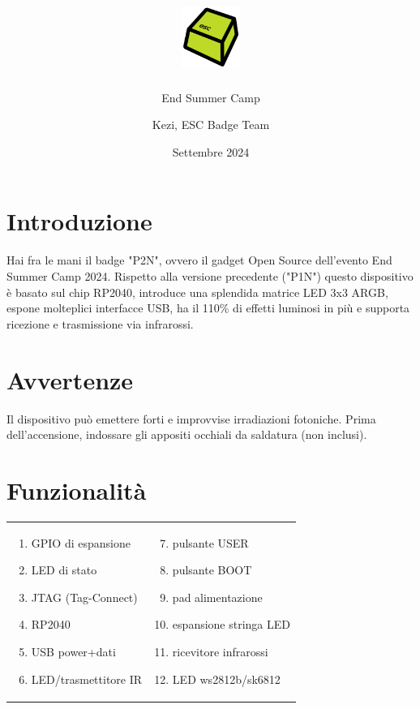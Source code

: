 \documentclass[10pt]{datasheet}
\title{\includegraphics[height=2cm]{logo} \raisebox{1\height}{Hardware mini-badge "P2N"}}
\author{End Summer Camp}
\date{Settembre 2024}
\author{Kezi, ESC Badge Team}
\begin{document}
	\maketitle
	
	\section{Introduzione}
	Hai fra le mani il badge "P2N", ovvero il gadget Open Source dell'evento End Summer Camp 2024.
	Rispetto alla versione precedente ("P1N") questo dispositivo è basato sul chip RP2040, introduce una splendida matrice LED 3x3 ARGB, espone molteplici interfacce USB, ha il 110\% di effetti luminosi in più e supporta ricezione e trasmissione via infrarossi.
	
	\section{Avvertenze}
	Il dispositivo può emettere forti e improvvise irradiazioni fotoniche.
	Prima dell'accensione, indossare gli appositi occhiali da saldatura
	(non inclusi).
	
	\section{Funzionalità}
	\begin{tabular}{l l}
		  \begin{minipage}{1.45in}

				\begin{enumerate}[itemsep=1pt]
				\item{GPIO di espansione}
				\item{LED di stato}
				\item{JTAG (Tag-Connect)}
				\item{RP2040}
				\item{USB power+dati}
				\item{LED/trasmettitore IR}

			\end{enumerate} 
			
			\end{minipage}&
				  \begin{minipage}{2in}

			\begin{enumerate}[itemsep=1pt]
			\setcounter{enumi}{6}
			\item{pulsante USER}
			\item{pulsante BOOT}
			\item{pad alimentazione}
			\item{espansione stringa LED}
			\item{ricevitore infrarossi}
			\item LED ws2812b/sk6812
			\end{enumerate} 
			
		\end{minipage}
	\end{tabular}
\end{document}
